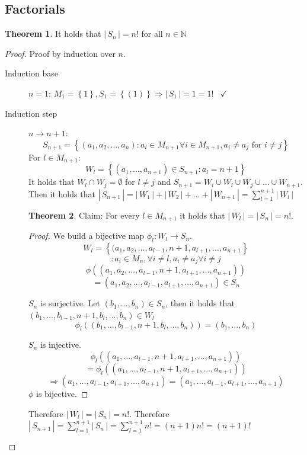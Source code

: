 \documentclass[a4paper,landscape,twocolumn]{article}
\theoremstyle{definition}
\newtheorem{theorem}{Theorem}
\newcommand\set[1]{\left\{#1\right\}}
\newcommand\card[1]{\left|\,#1\,\right|}
\newcommand\done{\hspace{10pt}\checkmark}
\begin{document}
\subsection{Factorials}
%
\begin{theorem}
  It holds that $\card{S_n} = n!$ for all $n \in \mathbb{N}$
\end{theorem}
\begin{proof}
  Proof by induction over $n$.
  \begin{description}
    \item[Induction base]
      $n=1$:
        $M_1 = \set{1}, S_1 = \set{(1)} \Rightarrow \card{S_1} = 1 = 1! \done$
    \item[Induction step]
      $n\rightarrow n+1$:
        \[
          S_{n+1} = \set{(a_1, a_2, \ldots, a_n) :
              a_i \in M_{n+1} \forall i \in M_{n+1},
              a_i \neq a_j \text{ for } i \neq j}
        \]
        For $l \in M_{n+1}$: \[
          W_l = \set{(a_1, \ldots, a_{n+1}) \in S_{n+1}: a_l = n+1}
        \]
        It holds that $W_l \cap W_j = \emptyset$ for $l \neq j$
        and $S_{n+1} = W_i \cup W_l \cup W_j \cup \ldots \cup W_{n+1}$.
        Then it holds that $\card{S_{n+1}} = \card{W_1} + \card{W_2} + \ldots + \card{W_{n+1}} = \sum_{l=1}^{n+1} \card{W_l}$

        \begin{theorem}
          Claim: For every $l \in M_{n+1}$ it holds that $\card{W_l} = \card{S_n} = n!$.
        \end{theorem}
        \begin{proof}
          We build a bijective map $\phi_l: W_l \rightarrow S_n$.
          \[
              W_l = \set{(a_1, a_2, \ldots, a_{l-1}, n+1, a_{l+1}, \ldots, a_{n+1}}
          \]\[
                  :a_i \in M_n, \forall i \neq l, a_i \neq a_j \forall i \neq j
          \] \[
              \phi\left((a_1, a_2, \ldots, a_{l-1}, n+1, a_{l+1}, \ldots, a_{n+1})\right)
          \] \[
                  = (a_1, a_2, \ldots, a_{l-1}, a_{l+1}, \ldots, a_{n+1}) \in S_n
          \]

          $S_n$ is surjective.
          Let $(b_1, \ldots, b_n) \in S_n$, then it holds that $(b_1, \ldots, b_{l-1}, n+1, b_l, \ldots, b_n) \in W_l$
          \[ \phi_l((b_1, \ldots, b_{l-1}, n+1, b_l, \ldots, b_n)) = (b_1, \ldots, b_n) \]

          $S_n$ is injective.
          \[
              \phi_l((a_1, \ldots, a_{l-1}, n+1, a_{l+1}, \ldots, a_{n+1}))
          \] \[
                  = \phi_l((a_1, \ldots, a_{l-1}, n+1, a_{l+1}, \dots, a_{n+1}))
          \] \[
               \Rightarrow
               (a_1, \ldots, a_{l-1}, a_{l+1}, \ldots, a_{n+1}) =
               (a_1, \ldots, a_{l-1}, a_{l+1}, \ldots, a_{n+1})
          \]
          $\phi$ is bijective.
        \end{proof}

        Therefore $\card{W_l} = \card{S_n} = n!$.
        Therefore $\card{S_{n+1}} = \sum_{l=1}^{n+1} \card{S_n} = \sum_{l=1}^{n+1} n! = (n + 1) n! = (n + 1)!$
  \end{description}
\end{proof}
\end{document}
